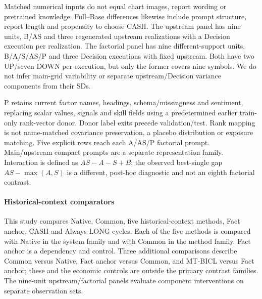 Matched numerical inputs do not equal chart images, report wording or pretrained knowledge. Full--Base differences likewise include prompt structure, report length and propensity to choose CASH. The upstream panel has nine units, B/AS and three regenerated upstream realizations with a Decision execution per realization. The factorial panel has nine different-support units, B/A/S/AS/P and three Decision executions with fixed upstream. Both have two UP/seven DOWN per execution, but only the former covers nine symbols. We do not infer main-grid variability or separate upstream/Decision variance components from their SDs.

P retains current factor names, headings, schema/missingness and sentiment, replacing scalar values, signals and skill fields using a predetermined earlier train-only rank-vector donor. Donor label exits precede validation/test. Rank mapping is not name-matched covariance preservation, a placebo distribution or exposure matching. Five explicit rows reach each A/AS/P factorial prompt. Main/upstream compact prompts are a separate representation family. Interaction is defined as $AS-A-S+B$; the observed best-single gap $AS-\max(A,S)$ is a different, post-hoc diagnostic and not an eighth factorial contrast.

\paragraph{Historical-context comparators}
This study compares Native, Common, five historical-context methods, Fact anchor, CASH and Always-LONG cycles. Each of the five methods is compared with Native in the system family and with Common in the method family. Fact anchor is a dependency and control. Three additional comparisons describe Common versus Native, Fact anchor versus Common, and MT-BICL versus Fact anchor; these and the economic controls are outside the primary contrast families. The nine-unit upstream/factorial panels evaluate component interventions on separate observation sets.

